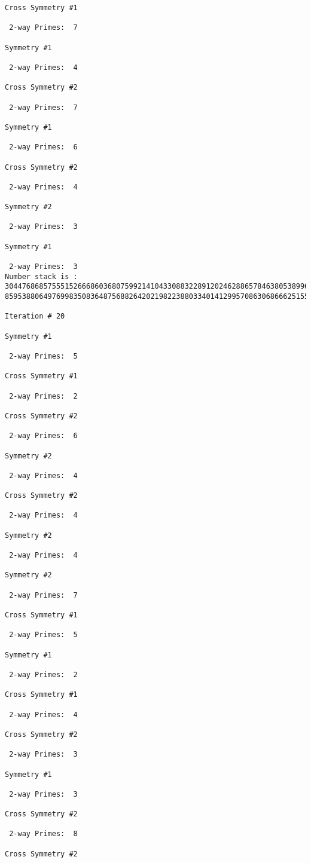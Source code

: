 \begin{verbatim}
Cross Symmetry #1

 2-way Primes: 	7

Symmetry #1

 2-way Primes: 	4

Cross Symmetry #2

 2-way Primes: 	7

Symmetry #1

 2-way Primes: 	6

Cross Symmetry #2

 2-way Primes: 	4

Symmetry #2

 2-way Primes: 	3

Symmetry #1

 2-way Primes: 	3
Number stack is :
30447686857555152666860368075992141043308832289120246288657846380538996794608835958544046240163340857
85953880649769983508364875688264202198223880334014129957086306866625155575868674403758043361042640445

Iteration #	20

Symmetry #1

 2-way Primes: 	5

Cross Symmetry #1

 2-way Primes: 	2

Cross Symmetry #2

 2-way Primes: 	6

Symmetry #2

 2-way Primes: 	4

Cross Symmetry #2

 2-way Primes: 	4

Symmetry #2

 2-way Primes: 	4

Symmetry #2

 2-way Primes: 	7

Cross Symmetry #1

 2-way Primes: 	5

Symmetry #1

 2-way Primes: 	2

Cross Symmetry #1

 2-way Primes: 	4

Cross Symmetry #2

 2-way Primes: 	3

Symmetry #1

 2-way Primes: 	3

Cross Symmetry #2

 2-way Primes: 	8

Cross Symmetry #2


\end{verbatim}
